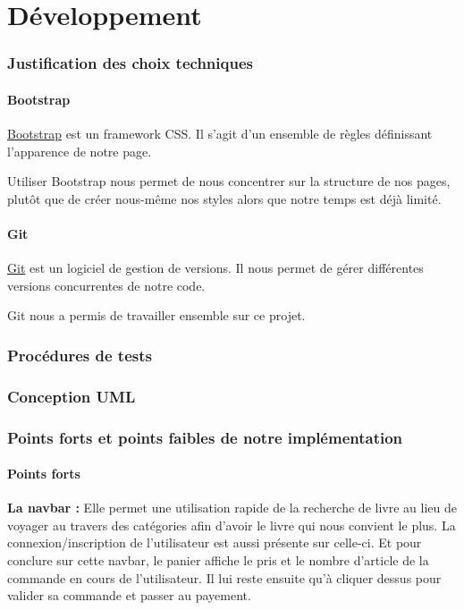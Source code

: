 \part{Développement}
\section{Justification des choix techniques}

	\subsection{Bootstrap}

		\href{http://getbootstrap.com/}{Bootstrap} est un framework CSS. Il s'agit d'un ensemble de règles définissant l'apparence de notre page.

		Utiliser Bootstrap nous permet de nous concentrer sur la structure de nos pages, plutôt que de créer nous-même nos styles alors que notre temps est déjà limité.

	\subsection{Git}

		\href{http://git-scm.com/}{Git} est un logiciel de gestion de versions. Il nous permet de gérer différentes versions concurrentes de notre code.

		Git nous a permis de travailler ensemble sur ce projet.

\section{Procédures de tests}
\section{Conception UML}
\section{Points forts et points faibles de notre implémentation}

	\subsection{Points forts}
	\textbf{La navbar :} Elle permet une utilisation rapide de la recherche de livre au lieu de voyager au travers des catégories afin d'avoir le livre qui nous convient le plus. La connexion/inscription de l'utilisateur est aussi présente sur celle-ci. Et pour conclure sur cette navbar, le panier affiche le pris et le nombre d'article de la commande en cours de l'utilisateur. Il lui reste ensuite qu'à cliquer dessus pour valider sa commande et passer au payement.

